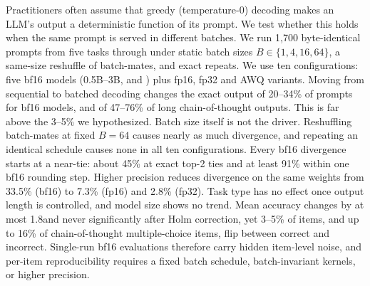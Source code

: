 Practitioners often assume that greedy (temperature-0) decoding makes an LLM's output a deterministic function of its prompt. We test whether this holds when the same prompt is served in different batches. We run 1,700 byte-identical prompts from five tasks through \vllm under static batch sizes $B\in\{1,4,16,64\}$, a same-size reshuffle of batch-mates, and exact repeats. We use ten configurations: five bf16 models (0.5B--3B, \qwen and \llama) plus fp16, fp32 and AWQ variants. Moving from sequential to batched decoding changes the exact output of 20--34\% of prompts for bf16 models, and of 47--76\% of long chain-of-thought outputs. This is far above the 3--5\% we hypothesized. Batch size itself is not the driver. Reshuffling batch-mates at fixed $B=64$ causes nearly as much divergence, and repeating an identical schedule causes none in all ten configurations. Every bf16 divergence starts at a near-tie: about 45\% at exact top-2 ties and at least 91\% within one bf16 rounding step. Higher precision reduces divergence on the same weights from 33.5\% (bf16) to 7.3\% (fp16) and 2.8\% (fp32). Task type has no effect once output length is controlled, and model size shows no trend. Mean accuracy changes by at most 1.8\pp and never significantly after Holm correction, yet 3--5\% of items, and up to 16\% of chain-of-thought multiple-choice items, flip between correct and incorrect. Single-run bf16 evaluations therefore carry hidden item-level noise, and per-item reproducibility requires a fixed batch schedule, batch-invariant kernels, or higher precision.
